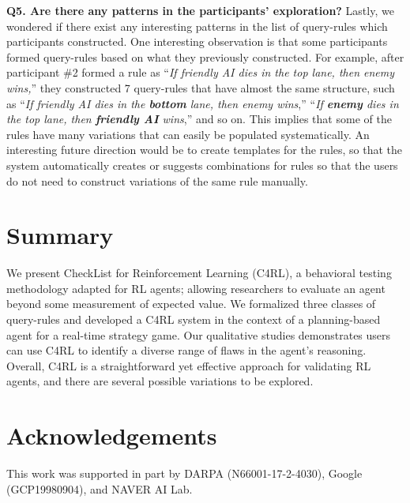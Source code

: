 \documentclass[letterpaper]{article} %
\begin{document}
\textbf{Q5. Are there any patterns in the participants' exploration?}
Lastly, we wondered if there exist any interesting patterns in the list of query-rules which participants constructed. 
One interesting observation is that
some participants
formed query-rules based on what they previously constructed.
For example,
after participant \#2 formed a rule as ``\textit{If friendly AI dies in the top lane, then enemy wins,}''
they constructed 7 query-rules that have almost the same structure, such as
``\textit{If friendly AI dies in the \textbf{bottom} lane, then enemy wins},''
``\textit{If \textbf{enemy} dies in the top lane, then \textbf{friendly AI} wins},'' and so on.
This implies that some of the rules have many variations that can easily be populated systematically. 
An interesting future direction would be to create templates for the rules, so that the system automatically creates or suggests combinations for rules so that the users do not need to construct variations of the same rule manually.


\section{Summary}
We present CheckList for Reinforcement Learning (C4RL), a behavioral testing methodology adapted for RL agents; allowing researchers to evaluate an agent beyond some measurement of expected value.
We formalized three classes of query-rules and developed a C4RL system in the context of a planning-based agent for a real-time strategy game. 
Our qualitative studies demonstrates users can use C4RL to identify a diverse range of flaws in the agent's reasoning.
Overall, C4RL is a straightforward yet effective approach for validating RL agents, and there are several possible variations to be explored. 


\section*{Acknowledgements}
This work was supported in part by DARPA (N66001-17-2-4030), Google (GCP19980904), and NAVER AI Lab.

\newpage


\end{document}
